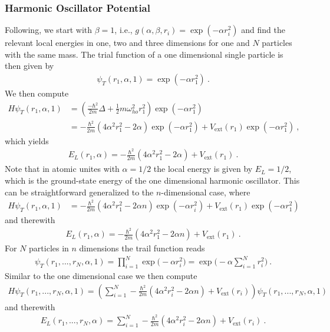 \documentclass[11pt,a4paper]{article}
\numberwithin{equation}{section}
\begin{document}
\subsubsection{Harmonic Oscillator Potential}
Following, we start with $\beta =1$, i.e., $g(\alpha, \beta, r_i)=\exp(-\alpha r_i^2)$ and find the relevant local energies in one, two and three dimensions for one and $N$ particles with the same mass. 
%
The trial function of a one dimensional single particle is then given by
\begin{align*}
\psi_T(r_1,\alpha,1) = \exp(-\alpha r_1^2)~.
\end{align*}
We then compute 
\begin{align*}
H\psi_T(r_1,\alpha,1)
&=
\left(\frac{-\hbar^2}{2m}\Delta +\frac{1}{2}m\omega_{ho}^2r_1^2\right)\exp(-\alpha r_1^2)\\
&=
-\frac{\hbar^2}{2m}\left(4\alpha^2r_1^2-2\alpha\right)\exp(-\alpha r_1^2)+V_{\mathrm{ext}}(r_1)\exp(-\alpha r_1^2)~,
\end{align*}
which yields 
\begin{align*}
E_L(r_1,\alpha)
=
-\frac{\hbar^2}{2m}\left(4\alpha^2r_1^2-2\alpha\right)+V_{\mathrm{ext}}(r_1)~.
\end{align*}
Note that in atomic unites with $\alpha=1/2$ the local energy is given by $E_L = 1/2$, which is the ground-state energy of the one dimensional harmonic oscillator.
% 
This can be straightforward generalized to the $n$-dimensional case, where
\begin{align*}
H\psi_T(r_1,\alpha,1)
&=
-\frac{\hbar^2}{2m}\left(4\alpha^2r_1^2-2\alpha n\right)\exp(-\alpha r_i^2)+V_{\mathrm{ext}}(r_1)\exp(-\alpha r_1^2)
\end{align*}
and therewith
\begin{align*}
E_L(r_1,\alpha)
=
-\frac{\hbar^2}{2m}\left(4\alpha^2r_1^2-2\alpha n\right)+V_{\mathrm{ext}}(r_1)~.
\end{align*}
For $N$ particles in $n$ dimensions the trail function reads
\begin{align*}
\psi_T(r_1,...,r_N,\alpha,1)
=
\prod_{i=1}^N\exp\big(-\alpha r_i^2\big)
=
\exp\big(-\alpha \sum_{i=1}^Nr_i^2\big)~.
\end{align*}
Similar to the one dimensional case we then compute
\begin{align*}
H\psi_T(r_1,...,r_N,\alpha,1)
=
\left(\sum_{i=1}^N-\frac{\hbar^2}{2m}\left(4\alpha^2r_i^2-2\alpha n\right)
+V_{\mathrm{ext}}(r_i)\right)\psi_T(r_1,...,r_N,\alpha,1)
\end{align*}
and therewith 
\begin{align*}
E_L(r_1,...,r_N,\alpha)
=
\sum_{i=1}^N-\frac{\hbar^2}{2m}\left(4\alpha^2r_i^2-2\alpha n\right)
+V_{\mathrm{ext}}(r_i)~.
\end{align*}
\end{document}
